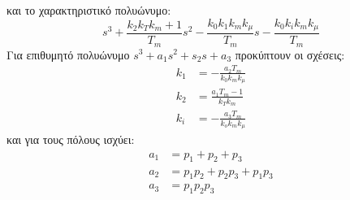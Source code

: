 και το χαρακτηριστικό πολυώνυμο:
\begin{equation}
  \label{eq:sI-A}
  s^3 + \frac{k_2 k_T k_m + 1}{T_m} s^2 -\frac{k_0 k_1 k_m k_{\mu}}{T_m} s - \frac{k_0 k_i k_m k_{\mu}}{T_m}
\end{equation}
Για επιθυμητό πολυώνυμο $s^3 + a_1 s^2 + s_2 s + a_3$ προκύπτουν οι σχέσεις:
\begin{align}
  \label{eq:ks}
  k_1 &= -\frac{a_2 T_m}{k_0 k_m k_{\mu}}\\
  k_2 &= \frac{a_1 T_m - 1}{k_T k_m}\\
  k_i &= -\frac{a_3 T_m}{k_o k_m k_{\mu}}
\end{align}
και για τους πόλους ισχύει:
\begin{align}
  a_1 &= p_1 + p_2 + p_3\\
  a_2 &= p_1 p_2 + p_2 p_3 + p_1 p_3\\
  a_3 &= p_1 p_2 p_3
\end{align}
